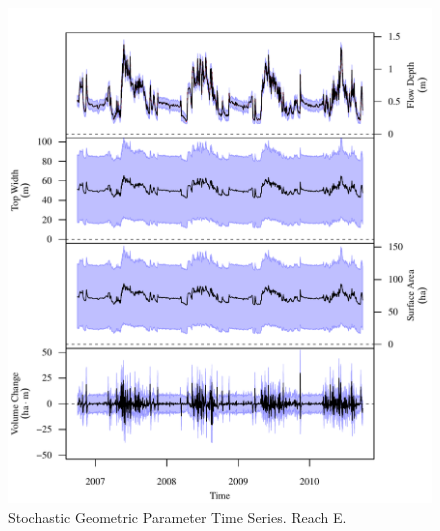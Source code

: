 \begin{figure}[htbp]
\begin{center}
	\includegraphics[width=5.5in]{"Figures/Results_USR/G TS E"}
	\caption{Stochastic Geometric Parameter Time Series.  Reach E.}
\end{center}
\end{figure}
\newpage

